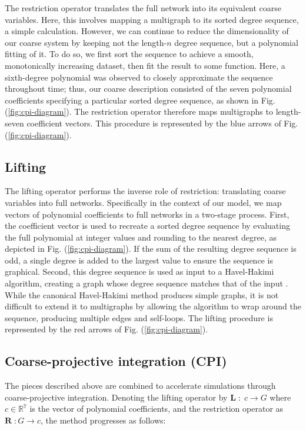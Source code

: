 \documentclass[epjST, final]{svjour}
\begin{document}
\begin{onehalfspace}
The restriction operator translates the full network into its equivalent coarse variables. Here, this involves mapping a multigraph to its sorted degree sequence, a simple calculation. However, we can continue to reduce the dimensionality of our coarse system by keeping not the length-$n$ degree sequence, but a polynomial fitting of it. To do so, we first sort the sequence to achieve a smooth, monotonically increasing dataset, then fit the result to some function. Here, a sixth-degree polynomial was observed to closely approximate the sequence throughout time; thus, our coarse description consisted of the seven polynomial coefficients specifying a particular sorted degree sequence, as shown in Fig. (\ref{fig:cpi-diagram}). The restriction operator therefore maps multigraphs to length-seven coefficient vectors. This procedure is represented by the blue arrows of Fig. (\ref{fig:cpi-diagram}).

\subsection{Lifting}

The lifting operator performs the inverse role of restriction: translating coarse variables into full networks. Specifically in the context of our model, we map vectors of polynomial coefficients to full networks in a two-stage process. First, the coefficient vector is used to recreate a sorted degree sequence by evaluating the full polynomial at integer values and rounding to the nearest degree, as depicted in Fig. (\ref{fig:cpi-diagram}). If the sum of the resulting degree sequence is odd, a single degree is added to the largest value to ensure the sequence is graphical. Second, this degree sequence is used as input to a Havel-Hakimi algorithm, creating a graph whose degree sequence matches that of the input \cite{havel_remark_1955,hakimi_realizability_1962}. While the canonical Havel-Hakimi method produces simple graphs, it is not difficult to extend it to multigraphs by allowing the algorithm to wrap around the sequence, producing multiple edges and self-loops. The lifting procedure is represented by the red arrows of Fig. (\ref{fig:cpi-diagram}).

\subsection{Coarse-projective integration (CPI)}
\label{sec:cpi}

The pieces described above are combined to accelerate simulations through coarse-projective integration. Denoting the lifting operator by $\mathbf{L} \; : \; c \rightarrow G$ where $c \in \mathbb{R}^7$ is the vector of polynomial coefficients, and the restriction operator as $\mathbf{R} \; : G \rightarrow c$, the method progresses as follows:


\end{onehalfspace}
\end{document}
